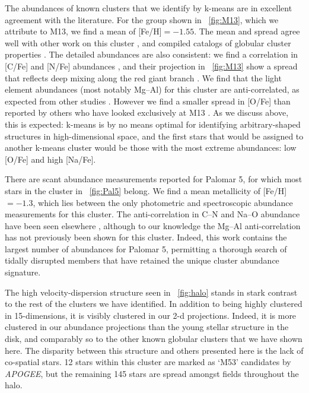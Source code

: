 \documentclass[12pt, letterpaper, preprint]{aastex}
\newcommand{\acronym}[1]{{\small{#1}}}
\newcommand{\project}[1]{\textsl{#1}}
\newcommand{\apogee}{\project{\acronym{APOGEE}}}
\begin{document}
The abundances of known clusters that we identify by k-means are in
excellent agreement with the literature. For the group shown in \figurename~\ref{fig:M13},
which we attribute to M13, we find a mean of [Fe/H]$ = -1.55$.
The mean and spread agree well with other work on this cluster
\citep{Kraft_1992,Cohen_Melendez_2005,Johnson_Pilachowski_2012}, and compiled catalogs of
globular cluster properties \citep[][accessed 2016]{Harris_1996}. The detailed abundances are also
consistent: we find a correlation in [C/Fe] and [N/Fe] abundances \citep{Smith_2005}, and their
projection in \figurename~\ref{fig:M13} show a spread that reflects deep mixing
along the red giant branch \citep{Briley_2004}. We find that the light element
abundances (most notably Mg--Al) for this cluster are anti-correlated, as
expected from other studies \citep[for example,][]{gratton}. However we find a
smaller spread in [O/Fe] than reported by others who have looked exclusively
at M13 \citep{Johnson_Pilachowski_2012}.  As we discuss above, this is expected:
k-means is by no means optimal for identifying arbitrary-shaped structures
in high-dimensional space, and the first stars that would be assigned to another k-means
cluster would be those with the most extreme abundances: low [O/Fe] and
high [Na/Fe].

There are scant abundance measurements reported for Palomar 5, for which
most stars in the cluster in \figurename~\ref{fig:Pal5} belong. We find a mean
metallicity of [Fe/H]$ = -1.3$, which lies between the only
photometric \citep{Geisler_1997} and spectroscopic \citep{Smith_1985,Smith_2002} abundance
measurements for this cluster.  The anti-correlation in C--N and Na--O abundance
have been seen elsewhere \citep[][respectively]{Smith_1985,Smith_2002}, although
to our knowledge the Mg--Al anti-correlation has not previously been shown for this cluster.
Indeed, this work contains the largest number of abundances for Palomar 5,
permitting a thorough search of tidally disrupted members \citep[for example,][]{Kuzma_2015} 
that have retained the unique cluster abundance signature.

The high velocity-dispersion structure seen in \figurename~\ref{fig:halo} stands
in stark contrast to the rest of the clusters we have identified. In
addition to being highly clustered in 15-dimensions, it is visibly
clustered in our 2-d projections. Indeed, it is more clustered in our
abundance projections than the young stellar structure in the disk,
and comparably so to the other known globular clusters that we have
shown here. The disparity between this structure and others presented
here is the lack of co-spatial stars. 12 stars within this cluster are
marked as `M53' candidates by \apogee, but the remaining 145 stars
are spread amongst fields throughout the halo.  
\end{document}
